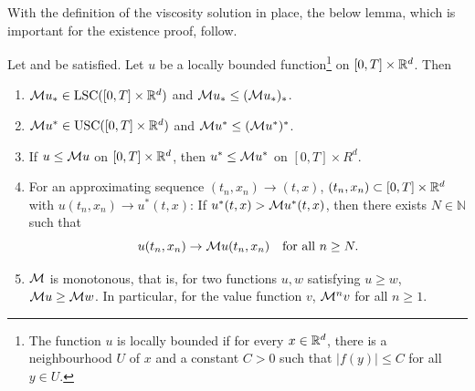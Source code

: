With the definition of the viscosity solution in place, the below lemma, which is important for the existence proof, follow.
\begin{lemma}
\label{lemma: Lemma 4.3 in Seydel}
    Let  and  be satisfied. Let $u$ be a locally bounded function\footnote{The function $u$ is locally bounded if for every $x \in \mathbb{R}^d$, there is a neighbourhood $U$ of $x$ and a constant $C>0$ such that $|f(y)| \leq C$ for all $y \in U$.} on $[0,T] \times \mathbb{R}^d$. Then
    \begin{enumerate}[label=(\roman*)]
        \item $\mathcal{M} u_* \in \operatorname{LSC} ([0,T] \times \mathbb{R}^d)$ and $\mathcal{M} u_* \leq (\mathcal{M} u_*)_*$.
        \item $\mathcal{M} u^* \in \operatorname{USC} ([0,T] \times \mathbb{R}^d)$ and $\mathcal{M} u^* \leq (\mathcal{M} u^*)^*$.
        \item If $u \leq \mathcal{M} u$ on $[0,T] \times \mathbb{R}^d$, then $u^* \leq \mathcal{M} u^*$ on $[0,T] \times R^d$.
        \item For an approximating sequence $(t_n,x_n) \rightarrow (t,x)$, $(t_n,x_n) \subset [0,T]\times \mathbb{R}^d$ with $u(t_n,x_n) \rightarrow u^*(t,x)$: \newline \indent If $u^*(t,x) > \mathcal{M} u^*(t,x)$, then there exists $N \in \mathbb N$ such that 
        \begin{equation*}
            u(t_n,x_n) \rightarrow \mathcal{M} u(t_n,x_n) \quad \text{for all } n \geq N.
        \end{equation*}
        \item $\mathcal{M}$ is monotonous, that is, for two functions $u,w$ satisfying $u \geq w$, $\mathcal{M} u \geq \mathcal{M} w$. In particular, for the value function $v$, $\mathcal{M}^n v$ for all $n \geq 1$. 
    \end{enumerate}
\end{lemma}

